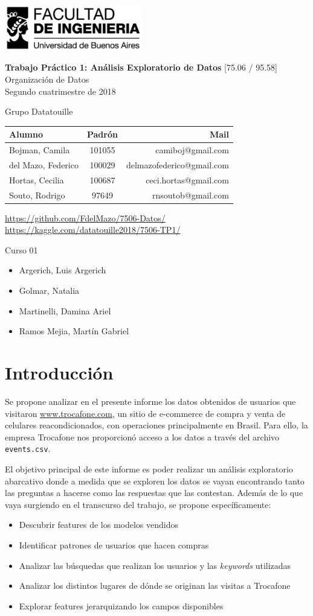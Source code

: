 \documentclass[a4paper]{article}
\makeatletter
\newcommand{\materia}{[75.06 / 95.58] Organización de Datos}
\newcommand{\trabajo}{Trabajo Práctico 1: Análisis Exploratorio de Datos}
\newcommand{\cuatrimestre}{Segundo cuatrimestre de 2018}
\newcommand{\grupo}{Grupo Datatouille}
\newcommand{\repo}{https://github.com/FdelMazo/7506-Datos/}
\newcommand{\kernel}{https://kaggle.com/datatouille2018/7506-TP1/}
\newcommand{\alumnos}{
    Bojman, Camila & 101055 &  camiboj@gmail.com\\
    del Mazo, Federico & 100029 & delmazofederico@gmail.com\\
    Hortas, Cecilia & 100687 & ceci.hortas@gmail.com\\
    Souto, Rodrigo & 97649 & rnsoutob@gmail.com\\
}
\newcommand{\curso}{Curso 01}
\newcommand{\docentes}{
    \item Argerich, Luis Argerich
    \item Golmar, Natalia
    \item Martinelli, Damina Ariel
    \item Ramos Mejia, Martín Gabriel
}
\makeatother
\begin{document}

\begin{titlepage}
	\hfill\includegraphics[width=6cm]{fiuba.jpg}
    \begin{center}
    \vfill
    \Huge \textbf{\trabajo}
    \vskip2cm
    \Large \materia\\
    \cuatrimestre
    \vfill
    \begin{flushleft} 
    \grupo
    \end{flushleft}
    \begin{tabular}{|l|c|r|}
	\hline
	Alumno & Padrón & Mail\\
	\hline \hline
    \alumnos
	\hline
	\end{tabular}
    \begin{flushleft} 
    \url{\repo} \\
    \url{\kernel}
    \end{flushleft}
    \vskip1cm
    \end{center}
    \curso
    \begin{itemize}
        \docentes
    \end{itemize}
\end{titlepage}
\tableofcontents
\newpage
{}
\setcounter{page}{1}

\section{Introducción}

Se propone analizar en el presente informe los datos obtenidos de usuarios que visitaron \url{www.trocafone.com}, un sitio de e-commerce de compra y venta de celulares reacondicionados, con operaciones principalmente en Brasil. Para ello, la empresa Trocafone nos proporcionó acceso a los datos a través del archivo \texttt{events.csv}. 

El objetivo principal de este informe es poder realizar un análisis exploratorio abarcativo donde a medida que se exploren los datos se vayan encontrando tanto las preguntas a hacerse como las respuestas que las contestan. Además de lo que vaya surgiendo en el transcurso del trabajo, se propone específicamente:
 
 \begin{itemize}
	 \item Descubrir features de los modelos vendidos
	 \item Identificar patrones de usuarios que hacen compras
	 \item Analizar las búsquedas que realizan los usuarios y las \textit{keywords} utilizadas
	 \item Analizar los distintos lugares de dónde se originan las visitas a Trocafone
	 \item Explorar features jerarquizando los campos disponibles
\end{itemize}
\end{document}
